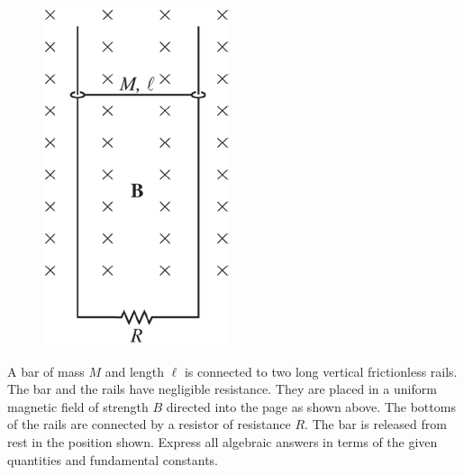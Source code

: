 %
\begin{figure}[H]
\centering
\includegraphics[scale=0.5]{images/img-014-034.png}
\end{figure}


\question
A bar of mass $M$ and length $\ell$ is connected to two long vertical frictionless rails. The bar and the rails have negligible resistance. They are placed in a uniform magnetic field of strength $B$ directed into the page as shown above. The bottoms of the rails are connected by a resistor of resistance $R$. The bar is released from rest in the position shown. Express all algebraic answers in terms of the given quantities and fundamental constants. %

